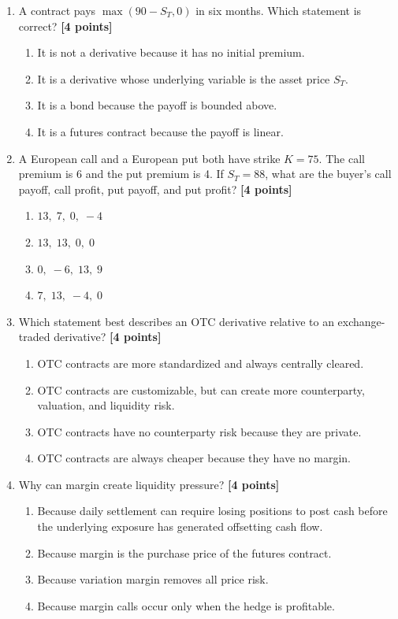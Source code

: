 \documentclass[11pt]{article}
\newcommand{\pts}[1]{\hspace{0.35em}\textnormal{\textbf{[#1 points]}}}
\newenvironment{choices}{\begin{enumerate}[label=\Alph*.,leftmargin=2.2em,itemsep=0.12em,topsep=0.12em]}{\end{enumerate}}
\begin{document}
\begin{enumerate}
    \item A contract pays $\max(90-S_T,0)$ in six months. Which statement is
    correct? \pts{4}
    \begin{choices}
        \item It is not a derivative because it has no initial premium.
        \item It is a derivative whose underlying variable is the asset price $S_T$.
        \item It is a bond because the payoff is bounded above.
        \item It is a futures contract because the payoff is linear.
    \end{choices}

    \item A European call and a European put both have strike $K=75$. The call
    premium is 6 and the put premium is 4. If $S_T=88$, what are the buyer's
    call payoff, call profit, put payoff, and put profit? \pts{4}
    \begin{choices}
        \item $13,\;7,\;0,\;-4$
        \item $13,\;13,\;0,\;0$
        \item $0,\;-6,\;13,\;9$
        \item $7,\;13,\;-4,\;0$
    \end{choices}

    \item Which statement best describes an OTC derivative relative to an
    exchange-traded derivative? \pts{4}
    \begin{choices}
        \item OTC contracts are more standardized and always centrally cleared.
        \item OTC contracts are customizable, but can create more counterparty,
        valuation, and liquidity risk.
        \item OTC contracts have no counterparty risk because they are private.
        \item OTC contracts are always cheaper because they have no margin.
    \end{choices}

    \item Why can margin create liquidity pressure? \pts{4}
    \begin{choices}
        \item Because daily settlement can require losing positions to post cash
        before the underlying exposure has generated offsetting cash flow.
        \item Because margin is the purchase price of the futures contract.
        \item Because variation margin removes all price risk.
        \item Because margin calls occur only when the hedge is profitable.
    \end{choices}
\end{enumerate}
\end{document}
